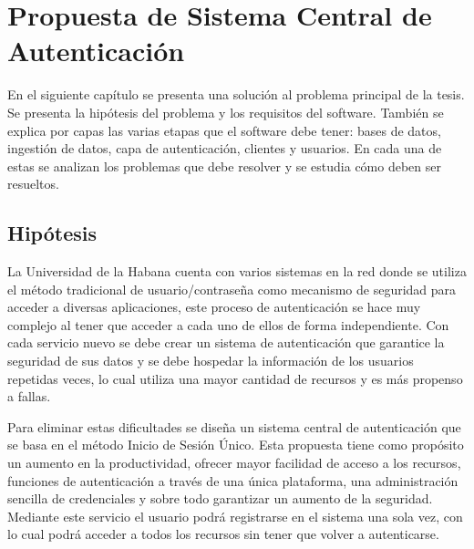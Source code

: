\chapter{Propuesta de Sistema Central de Autenticación}\label{chapter:proposal}
En el siguiente capítulo se presenta una solución al problema principal de la tesis. Se presenta la hipótesis del problema y los requisitos del software. También se explica por capas las varias etapas que el software debe tener: bases de datos, ingestión de datos, capa de autenticación, clientes y usuarios. En cada una de estas se analizan los problemas que debe resolver y se estudia cómo deben ser resueltos.
\section{Hipótesis}
La Universidad de la Habana cuenta con varios sistemas en la red donde se utiliza el método tradicional de usuario/contraseña como mecanismo de seguridad para acceder a diversas aplicaciones, este proceso de autenticación se hace muy complejo al tener que acceder a cada uno de ellos de forma independiente. Con cada servicio nuevo se debe crear un sistema de autenticación que garantice la seguridad de sus datos y se debe hospedar la información de los usuarios repetidas veces, lo cual utiliza una mayor cantidad de recursos y es más propenso a fallas.

Para eliminar estas dificultades se diseña un sistema central de autenticación que se basa en el método Inicio de Sesión Único. Esta propuesta tiene como propósito un aumento en la productividad, ofrecer mayor facilidad de acceso a los recursos, funciones de autenticación a través de una única plataforma, una administración sencilla de credenciales y sobre todo garantizar un aumento de la seguridad. Mediante este servicio el usuario podrá registrarse en el sistema una sola vez, con lo cual podrá acceder a todos los recursos sin tener que volver a autenticarse.


